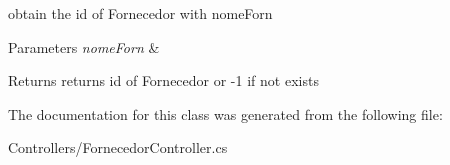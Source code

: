 obtain the id of Fornecedor with nome\+Forn 


\begin{DoxyParams}{Parameters}
{\em nome\+Forn} & \\
\hline
\end{DoxyParams}
\begin{DoxyReturn}{Returns}
returns id of Fornecedor or -\/1 if not exists
\end{DoxyReturn}


The documentation for this class was generated from the following file\+:\begin{DoxyCompactItemize}
\item 
Controllers/Fornecedor\+Controller.\+cs\end{DoxyCompactItemize}
